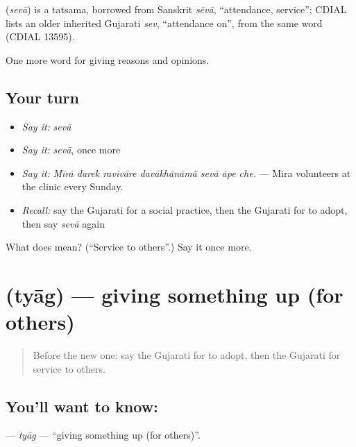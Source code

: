 \begin{cousinweb}
\textbf{} (\emph{sevā}) is a tatsama, borrowed from Sanskrit \emph{sēvā}, \textquotedblleft{}attendance, service\textquotedblright{}; CDIAL lists an older inherited Gujarati \emph{sev}, \textquotedblleft{}attendance on\textquotedblright{}, from the same word (CDIAL 13595).
\end{cousinweb}

\begin{grammarlens}[title={What you've built}]
One more word for giving reasons and opinions.
\end{grammarlens}

\subsection*{Your turn}
\begin{itemize}
\raggedright
  \item \emph{Say it:} \emph{sevā}
  \item \emph{Say it:} \emph{sevā}, once more
  \item \emph{Say it:} \emph{Mīrā darek ravivāre davākhānāmā̃ sevā āpe che.} — Mira volunteers at the clinic every Sunday.
  \item \emph{Recall:} say the Gujarati for a social practice, then the Gujarati for to adopt, then say \emph{sevā} again
\end{itemize}

\begin{tcolorbox}[breakable,colback=teal!4,colframe=teal!35!black,title={Before you move on}]
What does  mean? (\textquotedblleft{}Service to others\textquotedblright{}.) Say it once more.
\end{tcolorbox}
\section[\texorpdfstring{\gu{ત્યાગ} (tyāg)}{ત્યાગ (tyāg)}]{ (tyāg) — giving something up (for others)}

\label{lesson:GU-C358-tyag}



\begin{quote}
Before the new one: say the Gujarati for to adopt, then the Gujarati for service to others.
\end{quote}

\subsection*{You'll want to know: }
\textbf{} — \emph{tyāg} — \textquotedblleft{}giving something up (for others)\textquotedblright{}.

